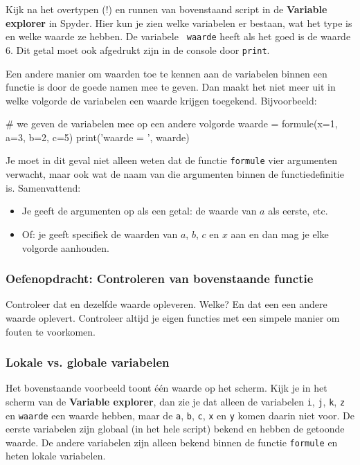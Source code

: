 \documentclass[a4paper,11pt, fleqn]{article}
\begin{document}
Kijk na het overtypen (!) en runnen van bovenstaand script in de \textbf{Variable explorer} in Spyder. Hier kun je zien welke variabelen er bestaan, wat het type is en welke waarde ze hebben. De variabele \verb, waarde, heeft als het goed is de waarde 6. Dit getal moet ook afgedrukt zijn in de console door \verb,print,.

Een andere manier om waarden toe te kennen aan de variabelen binnen een functie is door de goede namen mee te geven. Dan maakt het niet meer uit in welke volgorde de variabelen een waarde krijgen toegekend. Bijvoorbeeld:

\begin{python}
# we geven de variabelen mee op een andere volgorde
waarde = formule(x=1, a=3, b=2, c=5) 
print('waarde = ', waarde)
\end{python}

Je moet in dit geval niet alleen weten dat de functie \verb,formule, vier argumenten verwacht, maar ook wat de naam van die argumenten binnen de functiedefinitie is. Samenvattend:
\begin{itemize}
\item Je geeft de argumenten op als een getal: de waarde van $a$ als eerste, etc.
\item Of: je geeft specifiek de waarden van $a$, $b$, $c$ en $x$ aan en dan mag je elke volgorde aanhouden.
\end{itemize}

\subsubsection*{Oefenopdracht: Controleren van bovenstaande functie}
Controleer dat  en   dezelfde waarde opleveren. Welke? En dat een  een andere waarde oplevert. Controleer altijd je eigen functies met een simpele manier om fouten te voorkomen.

\subsubsection{Lokale vs. globale variabelen}
Het bovenstaande voorbeeld toont \'e\'en waarde op het scherm. Kijk je in het scherm van de \textbf{Variable explorer}, dan zie je dat alleen de variabelen \verb.i., \verb.j., \verb.k., \verb.z. en \verb.waarde. een waarde hebben, maar de \verb.a., \verb.b., \verb.c., \verb.x. en \verb.y. komen daarin niet voor.
De eerste variabelen zijn globaal (in het hele script) bekend en hebben de getoonde waarde. De andere variabelen zijn alleen bekend binnen de functie \verb.formule. en heten lokale variabelen. 
\end{document}
